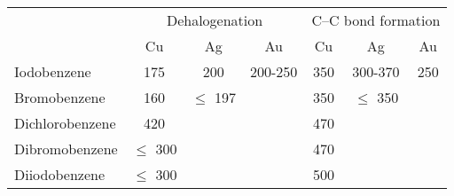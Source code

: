 \documentclass[aps,prl,reprint,amsmath,amssymb,floatfix,notitlepage]{revtex4-1}
\begin{document}
\begin{table*}
\centering\caption{Minimum experimentally measured temperatures (\si{\kelvin}) necessary for the completion of two Ullmann coupling steps.}
\begin{tabular}{ lcccccc }
 \hline
 \hline
  & \multicolumn{3}{c}{Dehalogenation} & \multicolumn{3}{c}{C--C bond formation} \\
  &\multicolumn{1}{c}{Cu} &\multicolumn{1}{c}{Ag} & \multicolumn{1}{c}{Au} & \multicolumn{1}{c}{Cu} &\multicolumn{1}{c}{Ag} &\multicolumn{1}{c}{Au}\\
 \hline
 Iodobenzene             &175\cite{sur_sci01} &200\cite{sur_sci02} &200-250\cite{sur_sci03} &350\cite{ullmann_68} &300-370\cite{ullmann_68} &250\cite{sur_sci03}\\
 Bromobenzene  &160\cite{ullmann_67} &$\leq$ 197\cite{sur_sci02}  &  &350\cite{ullmann_67}  &$\leq$ 350\cite{sur_sci02}  & \\
 Dichlorobenzene &420\cite{ullmann_52} & & &470\cite{ullmann_52} & & \\
 Dibromobenzene &$\leq$ 300\cite{ullmann_52} & & &470\cite{ullmann_98}  & & \\
 Diiodobenzene &$\leq$ 300\cite{ullmann_52} & & &500 \cite{ullmann_88} & & \\
 \hline
 \hline
\end{tabular}
\label{table:experimental-temperatures}
\end{table*}
\end{document}
